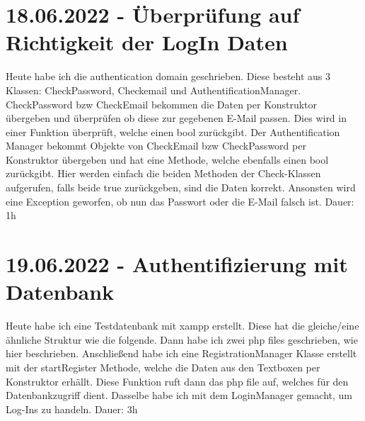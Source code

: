 \documentclass[letterpaper,10pt]{article}
\begin{document}
\section{18.06.2022 - Überprüfung auf Richtigkeit der LogIn Daten}
Heute habe ich die authentication domain geschrieben. Diese besteht aus 3 Klassen: CheckPassword, Checkemail und AuthentificationManager. CheckPassword bzw CheckEmail bekommen die Daten per Konstruktor übergeben und überprüfen ob diese zur gegebenen E-Mail passen. Dies wird in einer Funktion überprüft, welche einen bool zurückgibt. Der Authentification Manager bekommt Objekte von CheckEmail bzw CheckPassword per Konstruktor übergeben und hat eine Methode, welche ebenfalls einen bool zurückgibt. Hier werden einfach die beiden Methoden der Check-Klassen aufgerufen, falls beide true zurückgeben, sind die Daten korrekt. Ansonsten wird eine Exception geworfen, ob nun das Passwort oder die E-Mail falsch ist. Dauer: 1h
\section{19.06.2022 - Authentifizierung mit Datenbank}
Heute habe ich eine Testdatenbank mit xampp erstellt. Diese hat die gleiche/eine ähnliche Struktur wie die folgende. Dann habe ich zwei php files geschrieben, wie hier beschrieben\cite{mysql-php}. Anschließend habe ich eine RegistrationManager Klasse erstellt mit der startRegister Methode, welche die Daten aus den Textboxen per Konstruktor erhällt. Diese Funktion ruft dann das php file auf, welches für den Datenbankzugriff dient. Dasselbe habe ich mit dem LoginManager gemacht, um Log-Ins zu handeln. Dauer: 3h 
\printbibliography
\end{document}
